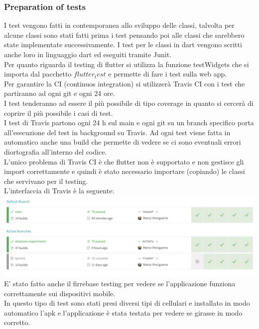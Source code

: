 \documentclass{article}
\begin{document}
\subsubsection{Preparation of tests}
I test vengono fatti in contemporanea allo sviluppo delle classi, talvolta per alcune classi
sono stati fatti prima i test pensando poi alle classi che sarebbero state implementate successivamente.
I test per le classi in dart vengono scritti anche loro in linguaggio dart ed eseguiti tramite Junit.
\\Per quanto riguarda il testing di flutter si utilizza la funzione testWidgets che si importa 
dal pacchetto $flutter_test$ e permette di fare i test sulla web app.
\\Per garantire la CI (continuos integration) si utilizzerà Travis CI con i test che partiranno ad
ogni git e ogni 24 ore.
\\I test tenderanno ad essere il più possibile di tipo coverage in quanto si cercerà di coprire 
il più possibile i casi di test.
\\I test di Travis partono ogni 24 h sul main e ogni git su un branch specifico porta all'esecuzione 
del test in background su Travis. Ad ogni test viene fatta in automatico anche una build che permette
di vedere se ci sono eventuali errori diortografia all'interno del codice.
\\L'unico problema di Travis CI è che flutter non è supportato e non gestisce gli import correttamente e quindi è stato necessario importare (copiando) le classi che 
servivano per il testing.
\\L'interfaccia di Travis è la seguente:
\\\includegraphics[scale = 0.25]{"Immagini/Travis.PNG"}
\\E' stato fatto anche il firrebase testing per vedere se l'applicazione funziona correttamente
sui dispositivi mobile.
\\In questo tipo di test sono stati presi diversi tipi di cellulari e installato in modo automatico 
l'apk e l'applicazione è stata testata per vedere se girasse in modo corretto.
\end{document}

